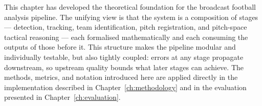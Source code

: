 This chapter has developed the theoretical foundation for 
the broadcast football analysis pipeline. The unifying 
view is that the system is a composition of stages — 
detection, tracking, team identification, pitch 
registration, and pitch-space tactical reasoning — each 
formalised mathematically and each consuming the outputs 
of those before it. This structure makes the pipeline 
modular and individually testable, but also tightly 
coupled: errors at any stage propagate downstream, so 
upstream quality bounds what later stages can achieve. 
The methods, metrics, and notation introduced here are 
applied directly in the implementation described in 
Chapter~\ref{ch:methodology} and in the evaluation 
presented in Chapter~\ref{ch:evaluation}.
